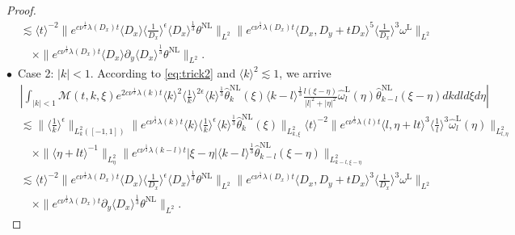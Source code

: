 \documentclass[reqno, 12pt]{amsart} %
\theoremstyle{plain} %
\theoremstyle{definition}
\theoremstyle{remark}
\numberwithin{equation}{section} %
\newcommand{\py}{\partial_y}
\begin{document}
\begin{proof}
\begin{equation}
\begin{aligned}
				& \lesssim\langle t\rangle^{-2}\|e^{c \nu^{\frac{1}{3}} \lambda\left(D_x\right) t}\langle D_x\rangle\langle\frac{1}{D_x}\rangle^\epsilon \langle D_x \rangle^\frac13  \theta^{\mathrm{NL}}\|_{L^2}\|e^{c \nu^{\frac{1}{3}} \lambda\left(D_x\right) t}\langle D_x, D_y+t D_x\rangle^5\langle\frac{1}{D_x}\rangle^3 \omega^{\mathrm{L}}\|_{L^2} \\
				& \quad \times\|e^{c \nu^{\frac{1}{3}} \lambda\left(D_x\right) t}\langle D_x\rangle \partial_y   \langle D_x \rangle^\frac13 \theta^{\mathrm{NL}}\|_{L^2}.
			\end{aligned}
		\end{equation}
		$\bullet$~Case 2:   $|k| < 1$. According to \eqref{eq:trick2} and $\langle k \rangle^2  \lesssim 1$, we arrive
		\begin{equation} \label{eq:temp15}
			\begin{aligned}
				& \left|\int_{|k| < 1}  \mathcal{M}(t, k, \xi) e^{2 c \nu^{\frac{1}{3}} \lambda(k) t}\langle k\rangle^2\langle\frac{1}{k}\rangle^{2 \epsilon} \langle k \rangle^\frac13  \hat{\theta }_k^{\mathrm{NL}}(\xi) \langle k-l \rangle^\frac13 \frac{l(\xi-\eta)}{|l|^2+|\eta|^2} \hat{\omega}_l^{\mathrm{L}}(\eta) \hat{\theta }_{k-l}^{\mathrm{NL}}(\xi-\eta)   d k d l d \xi d \eta\right| \\
				& \lesssim \| \langle\frac{1}{k}\rangle^{ \epsilon} \|_{L_k^2 ([-1, 1])}\|e^{c \nu^{\frac{1}{3}} \lambda(k) t}\langle k\rangle \langle \frac1k \rangle^\epsilon \langle k \rangle^\frac13  \hat{\theta}_k^{\mathrm{NL}}(\xi)\|_{L_{k, \xi}^2}\langle t\rangle^{-2}\|e^{c \nu^{\frac{1}{3}} \lambda(l) t}\langle l, \eta+l t\rangle^3\langle\frac{1}{l}\rangle^3 \hat{\omega}_l^{\mathrm{L}}(\eta)\|_{L_{l, \eta}^2} \\
				& \quad \times\|\langle \eta + lt\rangle^{-1}\|_{L_{ \eta}^2} 
				\|e^{c \nu^{\frac{1}{3}} \lambda(k-l) t}  |\xi - \eta| \langle k-l \rangle^\frac13  \hat{\theta}_{k-l}^{\mathrm{NL}}(\xi-\eta)\|_{L_{k-l, \xi-\eta}^2} \\
				& \lesssim\langle t\rangle^{-2} \|e^{c \nu^{\frac{1}{3}} \lambda\left(D_x\right) t}\langle D_x\rangle  \langle \frac{1}{D_x}\rangle^\epsilon \langle D_x \rangle^\frac13  \theta^{\mathrm{NL}}\|_{L^2}    \|e^{c \nu^{\frac{1}{3}} \lambda\left(D_x\right) t}\langle D_x, D_y + tD_x\rangle^3\langle\frac{1}{D_x}\rangle^3 \omega^{\mathrm{L}} \|_{L^2} \\
				&\quad \times \|e^{c \nu^{\frac{1}{3}} \lambda\left(D_x\right) t} \py \langle D_x \rangle^\frac13  \theta^{\mathrm{NL}} \|_{L^2}.
			\end{aligned}

\end{equation}
\end{proof}
\end{document}
